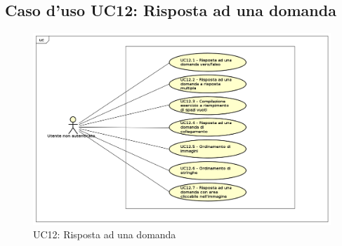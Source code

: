 \newpage
\subsection{Caso d'uso UC12: Risposta ad una domanda}
\label{UC11}
\begin{figure}[h]
	\centering
	\includegraphics[scale=0.5]{UML/UC12.png}
	\caption{UC12: Risposta ad una domanda}
\end{figure}